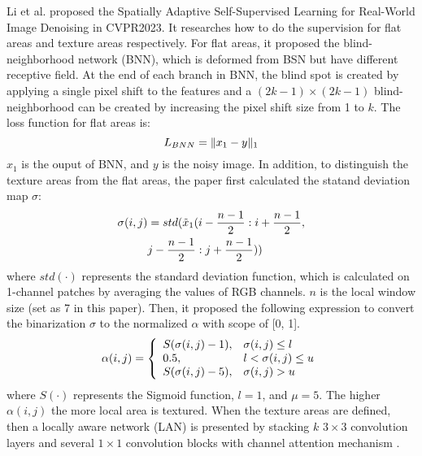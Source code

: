 \documentclass[conference]{IEEEtran}
\begin{document}
Li et al. \cite{li2023spatially} proposed the Spatially Adaptive Self-Supervised Learning for Real-World Image Denoising in CVPR2023. It researches how to do the supervision for flat areas and texture areas respectively. For flat areas, it proposed the blind-neighborhood network (BNN), which is deformed from BSN but have different receptive field. At the end of each branch in BNN, the blind spot is created by applying a single pixel shift to the features and a $(2k-1)\times (2k-1)$ blind-neighborhood can be created by increasing the pixel shift size from 1 to $k$.
The loss function for flat areas is:  
\begin{equation}
	\setlength{\abovedisplayskip}{0pt}
	\setlength{\belowdisplayskip}{0pt}
	L_{BNN} = \Vert x_1 -y \Vert_1
	\label{eq:Li_1}
\end{equation}  
$x_1$ is the ouput of BNN, and $y$ is the noisy image.
In addition, to distinguish the texture areas from the flat areas, the paper first calculated the statand deviation map $\sigma$:
\begin{equation}
	\setlength{\abovedisplayskip}{0pt}
	\setlength{\belowdisplayskip}{1pt}
	\begin{aligned}
		\sigma (i, j) &=std(\tilde{x}_1(i-\frac{n-1}{2}:i+\frac{n-1}{2}, \\
		&j-\frac{n-1}{2}:j+\frac{n-1}{2}))
	\end{aligned}
	\label{eq:Li_2}
\end{equation}
where $std(\cdot)$ represents the standard deviation function, which is calculated on 1-channel patches by averaging the values of RGB channels. $n$ is the local window size (set as 7 in this paper).
Then, it proposed the following expression to convert the binarization $\sigma$ to the normalized $\alpha$ with scope of [0, 1]. 
\begin{equation}
	\setlength{\abovedisplayskip}{0pt}
	\setlength{\belowdisplayskip}{0pt}
	\alpha(i,j) = \left\{\begin{array}{ll}
		S(\sigma(i,j)-1), & \sigma(i, j) \leq l\\
		0.5, & l < \sigma(i, j) \leq u\\
		S(\sigma(i,j)-5), & \sigma(i, j) > u
	\end{array} \right.	
	\label{eq:Li_3}
\end{equation}
where $S(\cdot)$ represents the Sigmoid function, $l=1$, and $\mu = 5$. The higher $\alpha (i,j)$ the more local area is textured.
When the texture areas are defined, then a locally aware network (LAN) is presented by stacking $k$ $3\times3$ convolution layers and several $1\times1$ convolution blocks with channel attention mechanism \cite{wen2021openmem}.
\end{document}
